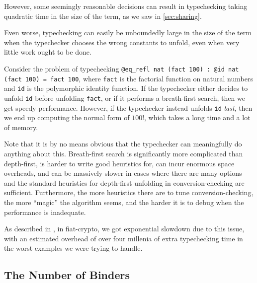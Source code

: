 However, some seemingly reasonable decisions can result in typechecking taking quadratic time in the size of the term, as we saw in \autoref{sec:sharing}.


Even worse, typechecking can easily be unboundedly large in the size of the term when the typechecker chooses the wrong constants to unfold, even when very little work ought to be done.


Consider the problem of typechecking \texttt{@eq\_refl nat (fact 100) : @id nat (fact 100) = fact 100}, where \texttt{fact} is the factorial function on natural numbers and \texttt{id} is the polymorphic identity function.
If the typechecker either decides to unfold \texttt{id} before unfolding \texttt{fact}, or if it performs a breath-first search, then we get speedy performance.
However, if the typechecker instead unfolds \texttt{id} \emph{last}, then we end up computing the normal form of $100!$, which takes a long time and a lot of memory.

Note that it is by no means obvious that the typechecker can meaningfully do anything about this.
Breath-first search is significantly more complicated than depth-first, is harder to write good heuristics for, can incur enormous space overheads, and can be massively slower in cases where there are many options and the standard heuristics for depth-first unfolding in conversion-checking are sufficient.
Furthermore, the more heuristics there are to tune conversion-checking, the more ``magic'' the algorithm seems, and the harder it is to debug when the performance is inadequate.

As described in , in fiat-crypto, we got exponential slowdown due to this issue, with an estimated overhead of over four millenia of extra typechecking time in the worst examples we were trying to handle.


\subsection{The Number of Binders}

